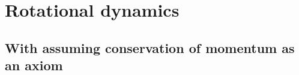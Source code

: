 \documentclass{article}
\begin{document}
\begin{comment}
\textbf{Proof that path-independence $\iff$ potential function}

In the situation in which work done by $\FF$ is path-independent (i.e. $\Delta U_{\FF, C}$ is independent of $C$), then $\FF(\xx) = -\nabla (\Delta U(\xx))$. To see this, note that, for any $C$ ending on the point $\xx$, we have

\begin{align*}
    -\Delta U_{\FF}(\xx) = W_{\FF, C} = \int_{C} \FF(\xx) \cdot d \xx = \int_C F_x(\xx) d x + \int_C F_y(\xx) d y + \int_C F_z(\xx) dz.
\end{align*}

We can choose to be $C$ whatever we want, and the integral will still be the same. Thus, after choosing $C$ to run parallel to the $x$-axis from $x = x_0$ to $x = x$, parallel to the $y$-axis from $y = y_0$ to $y = y$, and parallel to the $z$-axis from $z = z_0$ to $z$ (please forgive the lack of dummy variables), we get

\begin{align*}
    -\Delta U_{\FF}(\xx) = \int_{x_0}^x F_x(\xx) d x + \int_{y_0}^y F_y(\xx) d y + \int_{z_0}^z F_z(\xx) dz.
\end{align*}

At this point it's clear that $-\nabla (\Delta U_{\FF}(\xx)) = \nabla (-\Delta U_{\FF}(\xx)) = \FF(\xx)$.

(This discussion proves that when line integrals $\int_C \FF \cdot d \xx$ are path-independent, $\FF$ has a potential function: we explicitly constructed the potential function here. You can also show the other direction: if there is a ``potential function'' $\phi$ such that $\FF = \nabla \phi$, then line integrals $\int_C \FF \cdot dd \xx$ are path-independent. So, it turns out that ``line integrals involving $\FF$ are path-independent'' $\iff$ ``$\FF$ has a potential function''.)
\end{comment}

\newpage

\section*{Rotational dynamics}

\subsection*{With assuming conservation of momentum as an axiom}
\end{document}
